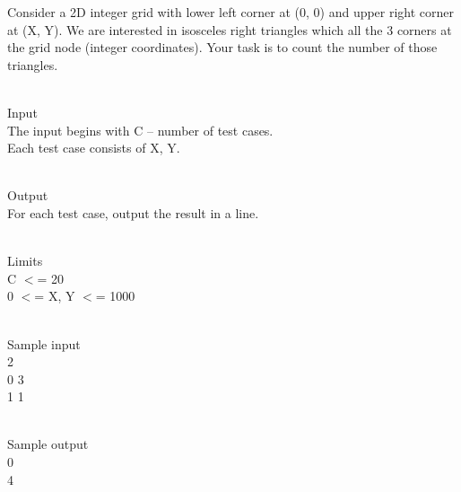 



   Consider a 2D integer grid with lower left corner at (0, 0) and upper right corner at (X, Y). We are interested in isosceles right triangles which all the 3 corners at the grid node (integer coordinates). Your task is to count the number of those triangles.  


\\   Input   
\\   The input begins with C – number of test cases.   
\\   Each test case consists of X, Y.  


\\   Output   
\\   For each test case, output the result in a line.  


\\   Limits   
\\   C $<$= 20   
\\   0 $<$= X, Y $<$= 1000  


\\   Sample input   
\\   2   
\\   0 3   
\\   1 1  


\\   Sample output   
\\   0   
\\   4  